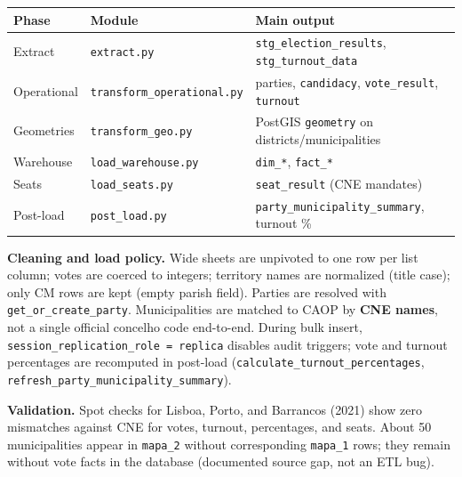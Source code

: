 \begin{center}
\small
\begin{tabular}{|l|l|l|}
\hline
\textbf{Phase} & \textbf{Module} & \textbf{Main output} \\
\hline
Extract & \texttt{extract.py} & \texttt{stg\_election\_results}, \texttt{stg\_turnout\_data} \\
Operational & \texttt{transform\_operational.py} & parties, \texttt{candidacy}, \texttt{vote\_result}, \texttt{turnout} \\
Geometries & \texttt{transform\_geo.py} & PostGIS \texttt{geometry} on districts/municipalities \\
Warehouse & \texttt{load\_warehouse.py} & \texttt{dim\_*}, \texttt{fact\_*} \\
Seats & \texttt{load\_seats.py} & \texttt{seat\_result} (CNE mandates) \\
Post-load & \texttt{post\_load.py} & \texttt{party\_municipality\_summary}, turnout \% \\
\hline
\end{tabular}
\end{center}

\textbf{Cleaning and load policy.} Wide sheets are unpivoted to one row per list column; votes are coerced to integers; territory names are normalized (title case); only CM rows are kept (empty parish field). Parties are resolved with \texttt{get\_or\_create\_party}. Municipalities are matched to CAOP by \textbf{CNE names}, not a single official concelho code end-to-end. During bulk insert, \texttt{session\_replication\_role = replica} disables audit triggers; vote and turnout percentages are recomputed in post-load (\texttt{calculate\_turnout\_percentages}, \texttt{refresh\_party\_municipality\_summary}).

\textbf{Validation.} Spot checks for Lisboa, Porto, and Barrancos (2021) show zero mismatches against CNE for votes, turnout, percentages, and seats. About 50 municipalities appear in \texttt{mapa\_2} without corresponding \texttt{mapa\_1} rows; they remain without vote facts in the database (documented source gap, not an ETL bug).

